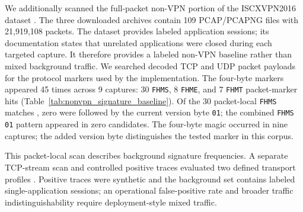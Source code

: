 \documentclass[preprint,12pt]{elsarticle}
\theoremstyle{plain}
\providecommand{\DIFaddtex}[1]{{\protect\color{blue} \sf #1}} %
\providecommand{\DIFdeltex}[1]{{\protect\color{red} \scriptsize #1}} %
\providecommand{\DIFaddbegin}{} %
\providecommand{\DIFaddend}{} %
\providecommand{\DIFdelbegin}{} %
\providecommand{\DIFdelend}{} %
\providecommand{\DIFadd}[1]{\texorpdfstring{\DIFaddtex{#1}}{#1}} %
\providecommand{\DIFdel}[1]{\texorpdfstring{\DIFdeltex{#1}}{}} %
\providecommand{\DIFscaledelfig}{0.5}
\newlength{\DIFdelgraphicswidth} %
\newlength{\DIFdelgraphicsheight} %
\providecommand{\DIFaddincludegraphics}[2][]{{\color{blue}\fbox{\DIFOincludegraphics[#1]{#2}}}} %
\providecommand{\DIFdelincludegraphics}[2][]{%
\sbox{\DIFdelgraphicsbox}{\DIFOincludegraphics[#1]{#2}}%
\settoboxwidth{\DIFdelgraphicswidth}{\DIFdelgraphicsbox} %
\settoboxtotalheight{\DIFdelgraphicsheight}{\DIFdelgraphicsbox} %
\scalebox{\DIFscaledelfig}{%
\parbox[b]{\DIFdelgraphicswidth}{\usebox{\DIFdelgraphicsbox}\\[-\baselineskip] \rule{\DIFdelgraphicswidth}{0em}}\llap{\resizebox{\DIFdelgraphicswidth}{\DIFdelgraphicsheight}{%
\setlength{\unitlength}{\DIFdelgraphicswidth}%
\begin{picture}(1,1)%
\thicklines\linethickness{2pt} %
{\color[rgb]{1,0,0}\put(0,0){\framebox(1,1){}}}%
{\color[rgb]{1,0,0}\put(0,0){\line( 1,1){1}}}%
{\color[rgb]{1,0,0}\put(0,1){\line(1,-1){1}}}%
\end{picture}%
}\hspace*{3pt}}} %
} %
\DeclareRobustCommand{\DIFaddbegin}{\DIFOaddbegin \let\includegraphics\DIFaddincludegraphics} %
\DeclareRobustCommand{\DIFaddend}{\DIFOaddend \let\includegraphics\DIFOincludegraphics} %
\DeclareRobustCommand{\DIFdelbegin}{\DIFOdelbegin \let\includegraphics\DIFdelincludegraphics} %
\DeclareRobustCommand{\DIFdelend}{\DIFOaddend \let\includegraphics\DIFOincludegraphics} %
\renewcommand{\DIFdel}[1]{}
\renewcommand{\DIFdelincludegraphics}[2][]{}
\begin{document}
We additionally scanned the full-packet non-VPN portion of the ISCXVPN2016
dataset \cite{drapergil2016iscx,unbiscx2016}. The three downloaded archives
contain 109 PCAP/PCAPNG files with 21,919,108 packets. The dataset provides
labeled application sessions; its documentation states that unrelated
applications were closed during each targeted capture. It therefore provides
a labeled non-VPN baseline rather than mixed background traffic. We searched
decoded TCP and UDP packet payloads for the protocol markers used by the
implementation. The four-byte markers appeared 45 times across 9 captures:
30 \texttt{FHMS}, 8 \texttt{FHME}, and 7 \texttt{FHMT} packet-marker hits
(Table~\ref{tab:nonvpn_signature_baseline}). \DIFdelbegin \DIFdel{None of }\DIFdelend \DIFaddbegin \DIFadd{Of }\DIFaddend the 30 packet-local \texttt{FHMS} matches\DIFdelbegin \DIFdel{was }\DIFdelend \DIFaddbegin \DIFadd{, zero were }\DIFaddend followed by the
current \DIFdelbegin \DIFdel{protocol }\DIFdelend version byte \texttt{01}; \DIFdelbegin \DIFdel{no packet-local \texttt{FHMS\,01} candidate was observed. The raw
}\DIFdelend \DIFaddbegin \DIFadd{the combined \texttt{FHMS\,01} pattern
appeared in zero candidates. The }\DIFaddend four-byte magic \DIFdelbegin \DIFdel{is therefore not unique in this corpus, while }\DIFdelend \DIFaddbegin \DIFadd{occurred in nine captures;
}\DIFaddend the added version byte \DIFdelbegin \DIFdel{removed the observed packet-local candidates}\DIFdelend \DIFaddbegin \DIFadd{distinguishes the tested marker in this corpus}\DIFaddend .

This packet-local scan \DIFdelbegin \DIFdel{is a background signature baseline, not a detector
evaluation. We therefore performed a }\DIFdelend \DIFaddbegin \DIFadd{describes background signature frequencies. A
}\DIFaddend separate TCP-stream scan and \DIFdelbegin \DIFdel{generated
}\DIFdelend controlled positive traces \DIFdelbegin \DIFdel{for two explicitly }\DIFdelend \DIFaddbegin \DIFadd{evaluated two }\DIFaddend defined
transport profiles\DIFdelbegin \DIFdel{, as
described next. The positive traces are synthetic , }\DIFdelend \DIFaddbegin \DIFadd{. Positive traces were synthetic }\DIFaddend and the background set
\DIFdelbegin \DIFdel{is
not mixed traffic; these experiments consequently provide neither }\DIFdelend \DIFaddbegin \DIFadd{contains labeled single-application sessions; }\DIFaddend an operational false-positive
rate \DIFdelbegin \DIFdel{nor evidence of indistinguishability in
deployed network }\DIFdelend \DIFaddbegin \DIFadd{and broader traffic indistinguishability require deployment-style mixed
}\DIFaddend traffic.
\end{document}
